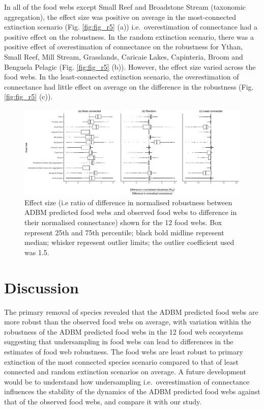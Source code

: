\documentclass{article}
\begin{document}
In all of the food webs except Small Reef and Broadstone Stream
(taxonomic aggregation), the effect size was positive on average in the
most-connected extinction scenario (Fig. \ref{fig:fig_r5} (a))
i.e.~overestimation of connectance had a positive effect on the
robustness. In the random extinction scenario, there was a positive
effect of overestimation of connectance on the robustness for Ythan,
Small Reef, Mill Stream, Grasslands, Caricaie Lakes, Capinteria, Broom
and Benguela Pelagic (Fig. \ref{fig:fig_r5} (b)). However, the effect
size varied across the food webs. In the least-connected extinction
scenario, the overestimation of connectance had little effect on average
on the difference in the robustness (Fig. \ref{fig:fig_r5} (c)).

\begin{figure}

{\centering \includegraphics[width=450px]{../results/plot_R50_slope} 

}

\caption{\label{fig:fig_r5} Effect size (i.e ratio of difference in normalised robustness between ADBM predicted food webs and observed food webs to difference in their normalised connectance) shown for the 12 food webs. Box represent 25th and 75th percentile; black bold midline represent median; whisker represent outlier limits; the outlier coefficient used was 1.5.}\label{fig:unnamed-chunk-6}
\end{figure}

\hypertarget{discussion}{%
\section{Discussion}\label{discussion}}

The primary removal of species revealed that the ADBM predicted food
webs are more robust than the observed food webs on average, with
variation within the robustness of the ADBM predicted food webs in the
12 food web ecosystems suggesting that undersampling in food webs can
lead to differences in the estimates of food web robustness. The food
webs are least robust to primary extinction of the most connected
species scenario compared to that of least connected and random
extinction scenarios on average. A future development would be to
understand how undersampling i.e.~overestimation of connectance
influences the stability of the dynamics of the ADBM predicted food webs
against that of the observed food webs, and compare it with our study.
\end{document}

